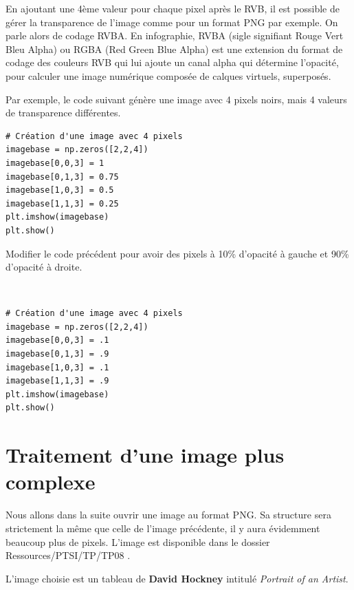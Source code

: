 En ajoutant une 4ème valeur pour chaque pixel après le RVB, il est possible de gérer la transparence de l'image comme pour un format PNG par exemple. On parle alors de codage RVBA. En infographie, RVBA (sigle signifiant Rouge Vert Bleu Alpha) ou RGBA (Red Green Blue Alpha) est une extension du format de codage des couleurs RVB qui lui ajoute un canal alpha qui détermine l’opacité, pour calculer une image numérique composée de calques virtuels, superposés. 

Par exemple, le code suivant génère une image avec 4 pixels noirs, mais 4 valeurs de transparence différentes.

\begin{verbatim}
# Création d'une image avec 4 pixels
imagebase = np.zeros([2,2,4])
imagebase[0,0,3] = 1
imagebase[0,1,3] = 0.75
imagebase[1,0,3] = 0.5
imagebase[1,1,3] = 0.25
plt.imshow(imagebase)
plt.show()
\end{verbatim}   

\begin{exercice}
Modifier le code précédent pour avoir des pixels à 10\% d'opacité à gauche et 90\% d'opacité à droite.
\end{exercice}

\begin{solution}~\\
\vspace{-0.7cm}
\begin{verbatim}
# Création d'une image avec 4 pixels
imagebase = np.zeros([2,2,4])
imagebase[0,0,3] = .1
imagebase[0,1,3] = .9
imagebase[1,0,3] = .1
imagebase[1,1,3] = .9
plt.imshow(imagebase)
plt.show()
\end{verbatim} 
\end{solution}

\section{Traitement d'une image plus complexe}

Nous allons dans la suite ouvrir une image au format PNG. Sa structure sera strictement la même que celle de l'image précédente, il y aura évidemment beaucoup plus de pixels. L'image est disponible dans le dossier \og Ressources/PTSI/TP/TP08 \fg.

L'image choisie est un tableau de \textbf{David Hockney} intitulé \textit{Portrait of an Artist}.

